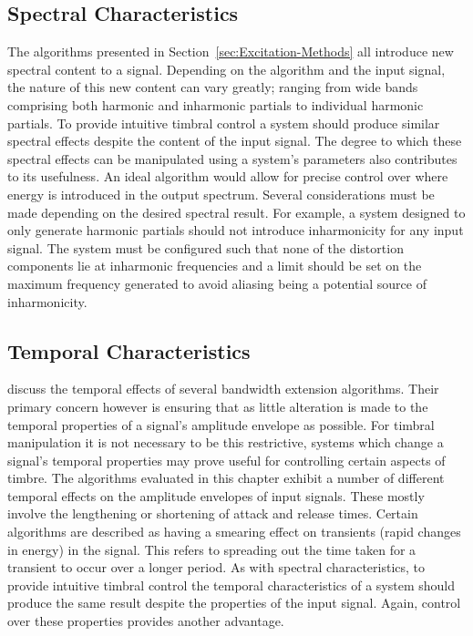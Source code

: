 	\subsection{Spectral Characteristics}
	\label{sec:ExcitationEvaluation-Evaluation-SpectralCharacteristics}
		The algorithms presented in Section~\ref{sec:Excitation-Methods} all introduce new spectral content to a
		signal. Depending on the algorithm and the input signal, the nature of this new content can vary greatly;
		ranging from wide bands comprising both harmonic and inharmonic partials to individual harmonic partials.
		To provide intuitive timbral control a system should produce similar spectral effects despite the content
		of the input signal. The degree to which these spectral effects can be manipulated using a system's
		parameters also contributes to its usefulness. An ideal algorithm would allow for precise control over
		where energy is introduced in the output spectrum. Several considerations must be made depending on the
		desired spectral result. For example, a system designed to only generate harmonic partials should not
		introduce inharmonicity for any input signal. The system must be configured such that none of the
		distortion components lie at inharmonic frequencies and a limit should be set on the maximum frequency
		generated to avoid aliasing being a potential source of inharmonicity.

	\subsection{Temporal Characteristics}
	\label{sec:ExcitationEvaluation-Evaluation-TemporalCharacteristics}		
		\citet{larsen2004audio} discuss the temporal effects of several bandwidth extension algorithms. Their
		primary concern however is ensuring that as little alteration is made to the temporal properties of a
		signal's amplitude envelope as possible. For timbral manipulation it is not necessary to be this
		restrictive, systems which change a signal's temporal properties may prove useful for controlling certain
		aspects of timbre. The algorithms evaluated in this chapter exhibit a number of different temporal effects
		on the amplitude envelopes of input signals. These mostly involve the lengthening or shortening of attack
		and release times.  Certain algorithms are described as having a smearing effect on transients (rapid
		changes in energy) in the signal. This refers to spreading out the time taken for a transient to occur over
		a longer period. As with spectral characteristics, to provide intuitive timbral control the temporal
		characteristics of a system should produce the same result despite the properties of the input signal.
		Again, control over these properties provides another advantage.

